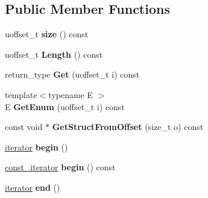 \subsection*{Public Member Functions}
\begin{DoxyCompactItemize}
\item 
\mbox{\label{classflatbuffers_1_1Vector_a602e093850b2984a95581edc0b47b2f3}} 
uoffset\+\_\+t {\bfseries size} () const
\item 
\mbox{\label{classflatbuffers_1_1Vector_a7ad86e7c749fd750a4e506439a358b06}} 
uoffset\+\_\+t {\bfseries Length} () const
\item 
\mbox{\label{classflatbuffers_1_1Vector_a0c322798bd0cebd2d20b0b0f92de2f9b}} 
return\+\_\+type {\bfseries Get} (uoffset\+\_\+t i) const
\item 
\mbox{\label{classflatbuffers_1_1Vector_a22b4449883dc8e24e87cde27839294c4}} 
{\footnotesize template$<$typename E $>$ }\\E {\bfseries Get\+Enum} (uoffset\+\_\+t i) const
\item 
\mbox{\label{classflatbuffers_1_1Vector_a1dc52eb3974e0484a5421752589d436b}} 
const void $\ast$ {\bfseries Get\+Struct\+From\+Offset} (size\+\_\+t o) const
\item 
\mbox{\label{classflatbuffers_1_1Vector_ac1ab40cdffad6cd50c222fe42c51437b}} 
\hyperlink{structflatbuffers_1_1VectorIterator}{iterator} {\bfseries begin} ()
\item 
\mbox{\label{classflatbuffers_1_1Vector_ac4633f563a5a52980ff0b56fa683a4de}} 
\hyperlink{structflatbuffers_1_1VectorIterator}{const\+\_\+iterator} {\bfseries begin} () const
\item 
\mbox{\label{classflatbuffers_1_1Vector_a53e9c0cb1d27e4bd355034dbd43f0127}} 
\hyperlink{structflatbuffers_1_1VectorIterator}{iterator} {\bfseries end} ()
\item 
\mbox{\label{classflatbuffers_1_1Vector_a9fcfb2e218f49d6d66a8b4a22aa58755}} 

\end{DoxyCompactItemize}
